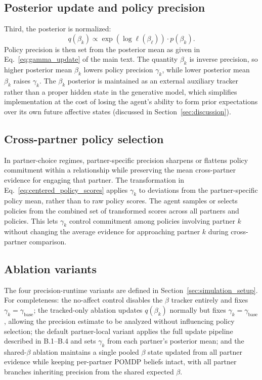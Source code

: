 \subsection{Posterior update and policy precision}

Third, the posterior is normalized:
\begin{equation}
q(\beta_k) \propto \exp(\log \ell(\beta_\ell)) \cdot p(\beta_k).
\label{eq:posterior_update}
\end{equation}
Policy precision is then set from the posterior mean as given in Eq.~\eqref{eq:gamma_update} of the main text. The quantity $\beta_k$ is inverse precision, so higher posterior mean $\beta_k$ lowers policy precision $\gamma_k$, while lower posterior mean $\beta_k$ raises $\gamma_k$. The $\beta_k$ posterior is maintained as an external auxiliary tracker rather than a proper hidden state in the generative model, which simplifies implementation at the cost of losing the agent's ability to form prior expectations over its own future affective states (discussed in Section~\ref{sec:discussion}).

\subsection{Cross-partner policy selection}

In partner-choice regimes, partner-specific precision sharpens or flattens policy commitment within a relationship while preserving the mean cross-partner evidence for engaging that partner. The transformation in Eq.~\eqref{eq:centered_policy_scores} applies $\gamma_k$ to deviations from the partner-specific policy mean, rather than to raw policy scores. The agent samples or selects policies from the combined set of transformed scores across all partners and policies. This lets $\gamma_k$ control commitment among policies involving partner $k$ without changing the average evidence for approaching partner $k$ during cross-partner comparison.

\subsection{Ablation variants}

The four precision-runtime variants are defined in Section~\ref{sec:simulation_setup}. For completeness: the no-affect control disables the $\beta$ tracker entirely and fixes $\gamma_k = \gamma_{\text{base}}$; the tracked-only ablation updates $q(\beta_k)$ normally but fixes $\gamma_k = \gamma_{\text{base}}$, allowing the precision estimate to be analyzed without influencing policy selection; the default partner-local variant applies the full update pipeline described in B.1--B.4 and sets $\gamma_k$ from each partner's posterior mean; and the shared-$\beta$ ablation maintains a single pooled $\beta$ state updated from all partner evidence while keeping per-partner POMDP beliefs intact, with all partner branches inheriting precision from the shared expected $\beta$.
